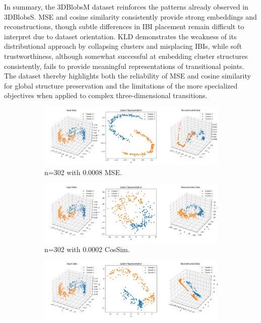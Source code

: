 In summary, the 3DBlobsM dataset reinforces the patterns already observed in 3DBlobsS. MSE and cosine similarity consistently provide strong embeddings and reconstructions, though subtle differences in IBI placement remain difficult to interpret due to dataset orientation. KLD demonstrates the weakness of its distributional approach by collapsing clusters and misplacing IBIs, while soft trustworthiness, although somewhat successful at embedding cluster structures consistently, fails to provide meaningful representations of transitional points. The dataset thereby highlights both the reliability of MSE and cosine similarity for global structure preservation and the limitations of the more specialized objectives when applied to complex three-dimensional transitions.

\begin{figure}[htbp]
  \centering
  \begin{subfigure}[b]{1.0\textwidth}
    \centering
    \includegraphics[width=\linewidth]{images/RQ2/mse/3DMoons_-1_0.0008.png}
    \caption{n=302 with 0.0008 MSE.}
    \label{fig:RQ2/mse/3DMoons}
  \end{subfigure}
  \hfill
  \begin{subfigure}[b]{1.0\textwidth}
    \centering
    \includegraphics[width=\linewidth]{images/RQ2/csi/3DMoons_2_0.0002.png}
    \caption{n=302 with 0.0002 CosSim.}
    \label{fig:RQ2/csi/3DMoons}
  \end{subfigure}
  \hfill
  \begin{subfigure}[b]{1.0\textwidth}
    \centering
    \includegraphics[width=\linewidth]{images/RQ2/kld/3DMoons_-1_0.0005.png}

\end{subfigure}
\end{figure}
